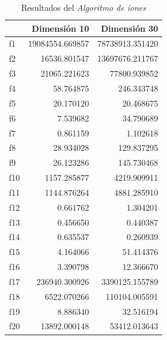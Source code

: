 \documentclass[a4paper,11pt]{article}
\begin{document}
 
  \begin{table}[H]	
  \caption{Resultados del \textit{Algoritmo de iones}}
  \centering
  \begin{tabular}{|l|r|r|}
  \hline
  &  \textbf{Dimensión 10}& \textbf{Dimensión 30} \\ \hline
  f1 &  19084554.669857 &  78738913.351420 \\ \hline
  f2 &  16536.801547 &  13697676.211767 \\ \hline
  f3 &  21065.221623 &  77800.939852 \\ \hline
  f4 &  58.764875 &  246.343748 \\ \hline
  f5 &  20.170120 &  20.468675 \\ \hline
  f6 &  7.539682 &  34.790689 \\ \hline
  f7 &  0.861159 &  1.102618 \\ \hline
  f8 &  28.934028 &  129.837295 \\ \hline
  f9 &  26.123286 &  145.730468 \\ \hline
  f10 &  1157.285877 &  4219.909911 \\ \hline
  f11 &  1144.876264 &  4881.285910 \\ \hline
  f12 &  0.661762 &  1.304201 \\ \hline
  f13 &  0.456650 &  0.440387 \\ \hline
  f14 &  0.635537 &  0.260939 \\ \hline
  f15 &  4.164066 &  51.414376 \\ \hline
  f16 &  3.390798 &  12.366670 \\ \hline
  f17 &  236940.300926 &  3390125.155789 \\ \hline
  f18 &  6522.070266 &  110104.005591 \\ \hline
  f19 &  8.886340 &  32.516194 \\ \hline
  f20 &  13892.000148 &  53412.013643 \\ \hline
  \end{tabular}  
  \label{ion-results}
  \end{table}
\end{document}
